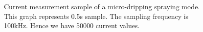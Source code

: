 \begin{figure}[H]
    \centering
    \caption{Current measurement sample of a micro-dripping spraying mode. This graph represents 0.5s sample. The sampling frequency is 100kHz. Hence we have 50000 current values.}
    \label{fig:microdripping_current_pic}
  \end{figure}


\clearpage